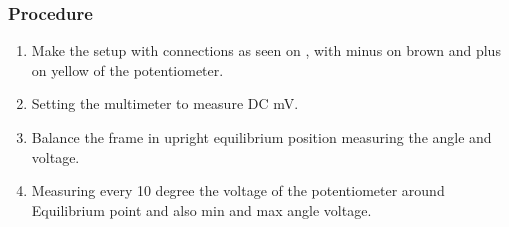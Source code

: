 \subsubsection{Procedure}
\begin{enumerate}
	\item Make the setup with connections as seen on , with minus on brown and plus on yellow of the potentiometer.
	\item Setting the multimeter to measure DC mV.
	\item Balance the frame in upright equilibrium position measuring the angle and voltage.
	\item Measuring every 10 degree the voltage of the potentiometer around Equilibrium point and also min and max angle voltage.
\end{enumerate}


